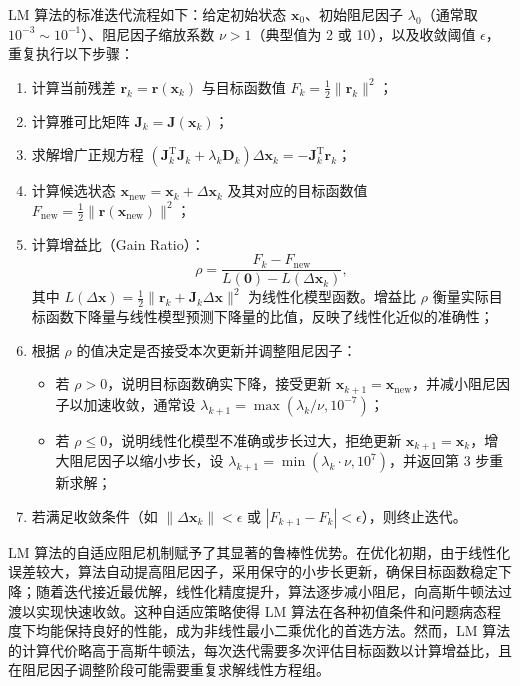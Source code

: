 LM 算法的标准迭代流程如下：给定初始状态 $\mathbf{x}_0$、初始阻尼因子 $\lambda_0$（通常取 $10^{-3}\sim 10^{-1}$）、阻尼因子缩放系数 $\nu>1$（典型值为 2 或 10），以及收敛阈值 $\epsilon$，重复执行以下步骤：
\begin{enumerate}
    \item 计算当前残差 $\mathbf{r}_k=\mathbf{r}(\mathbf{x}_k)$ 与目标函数值 $F_k=\frac{1}{2}\|\mathbf{r}_k\|^2$；
    \item 计算雅可比矩阵 $\mathbf{J}_k=\mathbf{J}(\mathbf{x}_k)$；
    \item 求解增广正规方程 $(\mathbf{J}_k^{\mathrm{T}}\mathbf{J}_k+\lambda_k\mathbf{D}_k)\Delta\mathbf{x}_k=-\mathbf{J}_k^{\mathrm{T}}\mathbf{r}_k$；
    \item 计算候选状态 $\mathbf{x}_{\mathrm{new}}=\mathbf{x}_k+\Delta\mathbf{x}_k$ 及其对应的目标函数值 $F_{\mathrm{new}}=\frac{1}{2}\|\mathbf{r}(\mathbf{x}_{\mathrm{new}})\|^2$；
    \item 计算增益比（Gain Ratio）：
    \begin{equation}
    \rho = \frac{F_k - F_{\mathrm{new}}}{L(\mathbf{0})-L(\Delta\mathbf{x}_k)},
    \end{equation}
    其中 $L(\Delta\mathbf{x})=\frac{1}{2}\|\mathbf{r}_k+\mathbf{J}_k\Delta\mathbf{x}\|^2$ 为线性化模型函数。增益比 $\rho$ 衡量实际目标函数下降量与线性模型预测下降量的比值，反映了线性化近似的准确性；
    \item 根据 $\rho$ 的值决定是否接受本次更新并调整阻尼因子：
    \begin{itemize}
        \item 若 $\rho>0$，说明目标函数确实下降，接受更新 $\mathbf{x}_{k+1}=\mathbf{x}_{\mathrm{new}}$，并减小阻尼因子以加速收敛，通常设 $\lambda_{k+1}=\max(\lambda_k/\nu,10^{-7})$；
        \item 若 $\rho\leq 0$，说明线性化模型不准确或步长过大，拒绝更新 $\mathbf{x}_{k+1}=\mathbf{x}_k$，增大阻尼因子以缩小步长，设 $\lambda_{k+1}=\min(\lambda_k\cdot\nu,10^7)$，并返回第 3 步重新求解；
    \end{itemize}
    \item 若满足收敛条件（如 $\|\Delta\mathbf{x}_k\|<\epsilon$ 或 $|F_{k+1}-F_k|<\epsilon$），则终止迭代。
\end{enumerate}

LM 算法的自适应阻尼机制赋予了其显著的鲁棒性优势。在优化初期，由于线性化误差较大，算法自动提高阻尼因子，采用保守的小步长更新，确保目标函数稳定下降；随着迭代接近最优解，线性化精度提升，算法逐步减小阻尼，向高斯牛顿法过渡以实现快速收敛。这种自适应策略使得 LM 算法在各种初值条件和问题病态程度下均能保持良好的性能，成为非线性最小二乘优化的首选方法。然而，LM 算法的计算代价略高于高斯牛顿法，每次迭代需要多次评估目标函数以计算增益比，且在阻尼因子调整阶段可能需要重复求解线性方程组。

